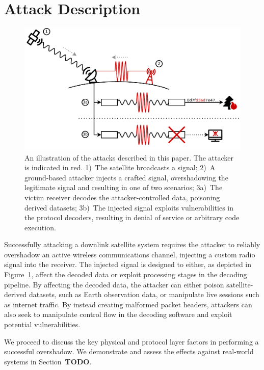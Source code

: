 \section{Attack Description}\label{sec:attack}

\begin{figure}
  \centering
  \includegraphics[width=\columnwidth]{diagrams/attack_illustration.pdf}
  \caption{An illustration of the attacks described in this paper. The attacker is indicated in red. 1)~The satellite broadcasts a signal; 2)~A ground-based attacker injects a crafted signal, overshadowing the legitimate signal and resulting in one of two scenarios; 3a)~The victim receiver decodes the attacker-controlled data, poisoning derived datasets; 3b)~The injected signal exploits vulnerabilities in the protocol decoders, resulting in denial of service or arbitrary code execution.}
  \label{fig:attack-illustration}
\end{figure}

Successfully attacking a downlink satellite system requires the attacker to reliably overshadow an active wireless communications channel, injecting a custom radio signal into the receiver.
The injected signal is designed to either, as depicted in Figure~\ref{fig:attack-illustration}, affect the decoded data or exploit processing stages in the decoding pipeline.
By affecting the decoded data, the attacker can either poison satellite-derived datasets, such as Earth observation data, or manipulate live sessions such as internet traffic.
By instead creating malformed packet headers, attackers can also seek to manipulate control flow in the decoding software and exploit potential vulnerabilities.

We proceed to discuss the key physical and protocol layer factors in performing a successful overshadow.
We demonstrate and assess the effects against real-world systems in Section~\textbf{TODO}.

